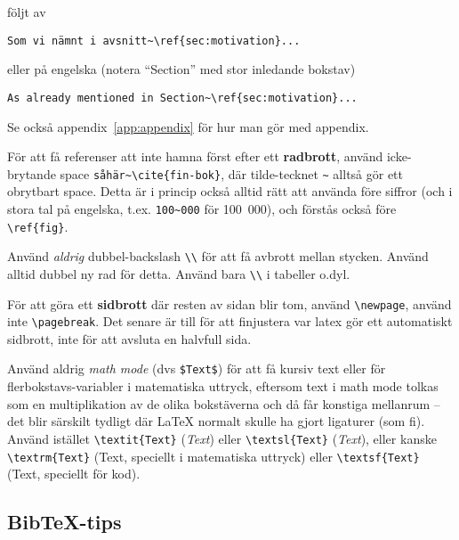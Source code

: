 följt av
\begin{verbatim}
Som vi nämnt i avsnitt~\ref{sec:motivation}...
\end{verbatim}
eller på engelska (notera ``Section'' med stor inledande bokstav)
\begin{verbatim}
As already mentioned in Section~\ref{sec:motivation}...
\end{verbatim}
Se också appendix~\vref{app:appendix} för hur man gör med appendix.

För att få referenser att inte hamna först efter ett \textbf{radbrott}, använd icke-brytande space \verb|såhär~\cite{fin-bok}|, där tilde-tecknet \verb|~| alltså gör ett obrytbart space. Detta är i princip också alltid rätt att använda före siffror (och i stora tal på engelska, t.ex. \verb|100~000| för 100~000), och förstås också före \verb|\ref{fig}|.

Använd \emph{aldrig} dubbel-backslash \verb|\\| för att få avbrott mellan stycken. Använd alltid dubbel ny rad för detta. Använd bara \verb|\\| i tabeller o.dyl.

För att göra ett \textbf{sidbrott} där resten av sidan blir tom, använd \verb|\newpage|, använd inte \verb|\pagebreak|. Det senare är till för att finjustera var latex gör ett automatiskt sidbrott, inte för att avsluta en halvfull sida.

Använd aldrig \textit{math mode} (dvs \verb|$Text$|) för att få kursiv text eller för flerbokstavs-variabler i matematiska uttryck, eftersom text i math mode tolkas som en multiplikation av de olika bokstäverna och då får konstiga mellanrum -- det blir särskilt tydligt där La\TeX{} normalt skulle ha gjort ligaturer (som fi). Använd istället \verb|\textit{Text}| (\textit{Text}) eller \verb|\textsl{Text}| (\textsl{Text}), eller kanske \verb|\textrm{Text}| (\textrm{Text}, speciellt i matematiska uttryck) eller \verb|\textsf{Text}| (\textsf{Text}, speciellt för kod).

\subsection{Bib\TeX-tips}


